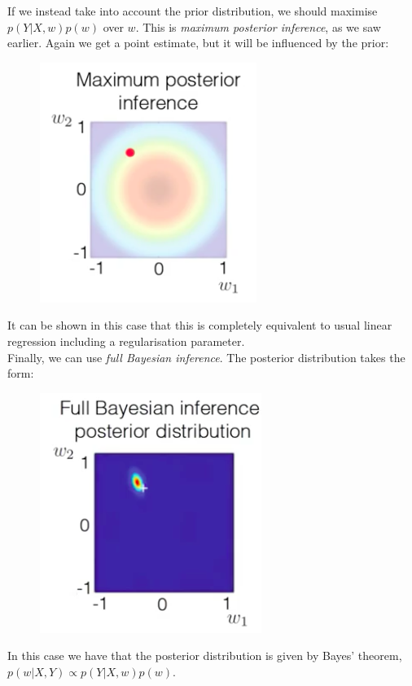 \newpage
If we instead take into account the prior distribution, we should maximise $p(Y | X,w)p(w)$ over $w$. This is \textit{maximum posterior inference}, as we saw earlier. Again we get a point estimate, but it will be influenced by the prior:
\begin{figure}[H]
\centering
\includegraphics[scale=0.4]{mpepoint.png}
\end{figure}
It can be shown in this case that this is completely equivalent to usual linear regression including a regularisation parameter.\\

Finally, we can use \textit{full Bayesian inference}. The posterior distribution takes the form:
\begin{figure}[H]
\centering
\includegraphics[scale=0.4]{fullinference.png}
\end{figure}
In this case we have that the posterior distribution is given by Bayes' theorem, $p(w | X,Y) \propto p(Y | X,w)p(w)$.\\

